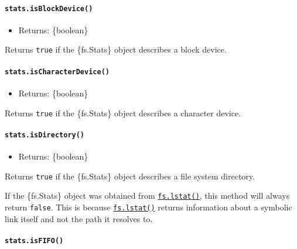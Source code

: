 \paragraph{\texorpdfstring{\texttt{stats.isBlockDevice()}}{stats.isBlockDevice()}}\label{stats.isblockdevice}

\begin{itemize}
\tightlist
\item
  Returns: \{boolean\}
\end{itemize}

Returns \texttt{true} if the \{fs.Stats\} object describes a block
device.

\paragraph{\texorpdfstring{\texttt{stats.isCharacterDevice()}}{stats.isCharacterDevice()}}\label{stats.ischaracterdevice}

\begin{itemize}
\tightlist
\item
  Returns: \{boolean\}
\end{itemize}

Returns \texttt{true} if the \{fs.Stats\} object describes a character
device.

\paragraph{\texorpdfstring{\texttt{stats.isDirectory()}}{stats.isDirectory()}}\label{stats.isdirectory}

\begin{itemize}
\tightlist
\item
  Returns: \{boolean\}
\end{itemize}

Returns \texttt{true} if the \{fs.Stats\} object describes a file system
directory.

If the \{fs.Stats\} object was obtained from
\hyperref[fslstatpath-options-callback]{\texttt{fs.lstat()}}, this
method will always return \texttt{false}. This is because
\hyperref[fslstatpath-options-callback]{\texttt{fs.lstat()}} returns
information about a symbolic link itself and not the path it resolves
to.

\paragraph{\texorpdfstring{\texttt{stats.isFIFO()}}{stats.isFIFO()}}\label{stats.isfifo}

